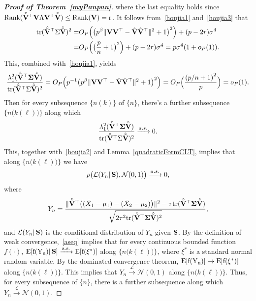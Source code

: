 \documentclass[times,sort&compress,3p]{elsarticle}
\newcommand{\mytr}{\rm tr}
\newcommand{\myrank}{\rm Rank}
\newcommand{\myE}{\rm E}
\theoremstyle{plain}
\theoremstyle{definition}
\theoremstyle{remark}
\begin{document}
\begin{appendices}
\begin{proof}[\textbf{Proof of Theorem~\ref{myPanpan}}]
where the last equality holds since $\myrank(\hat{\tilde{\BV}}^\top  \BV \bLambda \BV^\top  \hat{\tilde{\BV}})\leq \myrank(\BV)=r$.
It follows from~\eqref{houjia1} and~\eqref{houjia3} that
\begin{equation}\label{traceA1}
    \begin{aligned}
        \mytr(\hat{\tilde{\BV}}^\top \bSigma\hat{\tilde{\BV}})^2=&
    O_P\Big(\big(p^{\beta}\|\BV\BV^\top -\hat{\BV}\hat{\BV}^\top \|^2+1\big)^2\Big)
    +
    (p-2r)\sigma^4\\
    =&
        O_P\Big(\big(\frac{p}{n}+1\big)^2\Big)
    +
    (p-2r)\sigma^4
    =p\sigma^4(1+o_P(1)).
    \end{aligned}
\end{equation}
This, combined with~\eqref{houjia1}, yields
$$
\frac{\lambda_1^2(\hat{\tilde{\BV}}^\top \bSigma\hat{\tilde{\BV}})}{\mytr(\hat{\tilde{\BV}}^\top \bSigma\hat{\tilde{\BV}})^2}
=O_P\Big(p^{-1}\big(p^{\beta}\|\BV\BV^\top -\hat{\BV}\hat{\BV}^\top \|^2+1\big)^2\Big)
        =O_P\Big(\frac{{(p/n+1)}^2}{p}\Big)=o_P(1).
$$
Then for every subsequence $\{n(k)\}$ of $\{n\}$, there's a further subsequence $\big\{n\big(k(\ell)\big)\big\}$ along which
$$
\frac{\lambda_1^2(\hat{\tilde{\BV}}^\top \bSigma\hat{\tilde{\BV}})}{\mytr(\hat{\tilde{\BV}}^\top \bSigma\hat{\tilde{\BV}})^2}\xrightarrow{a.s.}0.
$$
This, together with~\eqref{houjia2} and Lemma~\ref{quadraticFormCLT}, implies that along $\big\{n\big(k(\ell)\big)\big\}$ we have
\begin{equation}\label{aseq}
    \rho\big(\mathcal{L}( Y_n |\,\mathbf{S}),\mathcal{N}(0,1)\big)\xrightarrow{a.s.}0,
\end{equation}
where 
$$
Y_n=\frac{\|\hat{\tilde{\mathbf{V}}}^\top \big((\bar{X}_1-\mu_1)-(\bar{X}_2-\mu_2)\big)\|^2-\tau\mathrm{tr}(\hat{\tilde{\mathbf{V}}}^\top \boldsymbol{\Sigma}\hat{\tilde{\mathbf{V}}})}{\sqrt{2\tau^2\mathrm{tr}(\hat{\tilde{\mathbf{V}}}^\top \boldsymbol{\Sigma}\hat{\tilde{\mathbf{V}}})^2}},
$$
and $\mathcal{L}(Y_n|\,\mathbf{S})$ is the conditional distribution of $Y_n$ given $\mathbf{S}$.
By the definition of weak convergence,~\eqref{aseq} implies that for every continuous bounded function $f(\cdot)$, $\myE[f(Y_n)|\,\BS]\xrightarrow{a.s.}\myE[f(\xi^*)]$ along $\big\{n\big(k(\ell)\big)\big\}$, where $\xi^*$ is a standard normal random variable.
By the dominated convergence theorem, $\myE[f(Y_n)]\to \myE[f(\xi^*)]$ along $\big\{n\big(k(\ell)\big)\big\}$.
This implies that $Y_n\xrightarrow{\mathcal{L}}\mathcal{N}(0,1)$ along $\big\{n\big(k(\ell)\big)\big\}$.
Thus, for every subsequence of $\{n\}$, there is a further subsequence along which
$Y_n\xrightarrow{\mathcal{L}}\mathcal{N}(0,1)$.

\end{proof}
\end{appendices}
\end{document}
